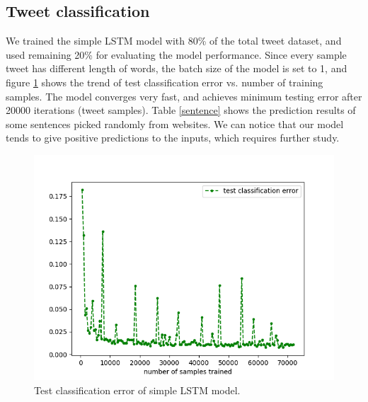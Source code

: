\documentclass{article}
\begin{document}
\subsection{Tweet classification}

We trained the simple LSTM model with 80\% of the total tweet dataset, and used remaining 20\% for evaluating the model performance. Since every sample tweet has different length of words, the batch size of the model is set to 1, and figure \ref{fig:test error} shows the trend of test classification error vs. number of training samples. The model converges very fast, and achieves minimum testing error after 20000 iterations (tweet samples). Table \ref{sentence} shows the prediction results of some sentences picked randomly from websites. We can notice that our model tends to give positive predictions to the inputs, which requires further study. 




\begin{figure}
\begin{center}
\includegraphics[scale=0.6]{Figure2.png}
\caption{Test classification error of simple LSTM model.}
\label{fig:test error}
\end{center}
\end{figure}
\end{document}
